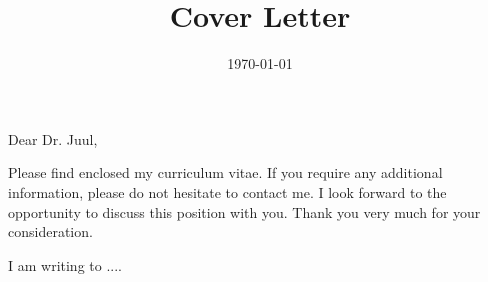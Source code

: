 \documentclass[11pt,a4paper,roman]{moderncv}
\title{Cover Letter}
\begin{document}
\date{\today}
\opening{Dear Dr. Juul,}
\closing{Please find enclosed my curriculum vitae. If you require any additional information, please do not hesitate to contact me. I look forward to the opportunity to discuss this position with you.
Thank you very much for your consideration.}
\makelettertitle

I am writing to .... 

\vspace{0.5cm}
\makeletterclosing
\end{document}
